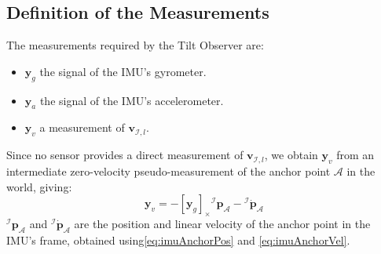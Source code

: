 \documentclass{IJCAS}
\begin{document}
\subsection{Definition of the Measurements} \label{subsec:tiltMeas}
The measurements required by the Tilt Observer are:
\begin{itemize}
    \item $\boldsymbol{y}_{g}$ the signal of the IMU's gyrometer.
    \item $\boldsymbol{y}_{a}$ the signal of the IMU's accelerometer.
    \item $\boldsymbol{y}_{v}$ a measurement of $\boldsymbol{v}_{\mathcal{I}, l}$.
\end{itemize}
Since no sensor provides a direct measurement of $\boldsymbol{v}_{\mathcal{I}, l}$, we obtain $\boldsymbol{y}_{v}$ from an intermediate zero-velocity pseudo-measurement of the anchor point $\mathcal{A}$ in the world, giving:
\begin{equation}
    \boldsymbol{y}_v = - \left[\boldsymbol{y}_{g}\right]_{\times} {^{\mathcal{I}}}\boldsymbol{p}_{\mathcal{A}} - {^{\mathcal{I}}} \dot{\boldsymbol{p}}_{\mathcal{A}} \label{eq:yv}
\end{equation}
${^{\mathcal{I}}}\boldsymbol{p}_{\mathcal{A}}$ and ${^{\mathcal{I}}} \dot{\boldsymbol{p}}_{\mathcal{A}}$ are the position and linear velocity of the anchor point in the IMU's frame, obtained using\eqref{eq:imuAnchorPos} and \eqref{eq:imuAnchorVel}.
\end{document}
